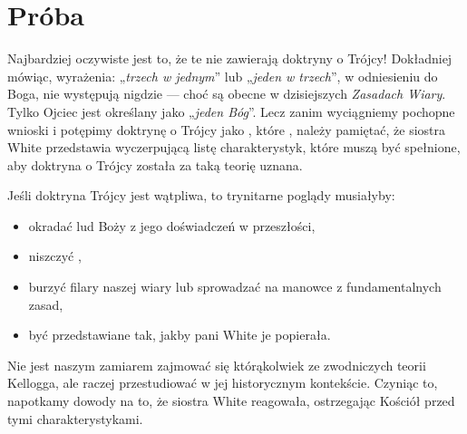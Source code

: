 \section*{Próba}

Najbardziej oczywiste jest to, że te  nie zawierają doktryny o Trójcy! Dokładniej mówiąc, wyrażenia: „\textit{trzech w jednym}” lub „\textit{jeden w trzech}”, w odniesieniu do Boga, nie występują nigdzie — choć są obecne w dzisiejszych \textit{Zasadach Wiary}. Tylko Ojciec jest określany jako „\textit{jeden Bóg}”. Lecz zanim wyciągniemy pochopne wnioski i potępimy doktrynę o Trójcy jako , które , należy pamiętać, że siostra White przedstawia wyczerpującą listę charakterystyk, które muszą być spełnione, aby doktryna o Trójcy została za taką teorię uznana.

Jeśli doktryna Trójcy jest wątpliwa, to trynitarne poglądy musiałyby:
\begin{itemize}
    \item okradać lud Boży z jego doświadczeń w przeszłości,
    \item niszczyć ,
    \item burzyć filary naszej wiary lub sprowadzać na manowce z fundamentalnych zasad,
    \item być przedstawiane tak, jakby pani White je popierała.
\end{itemize}

Nie jest naszym zamiarem zajmować się którąkolwiek ze zwodniczych teorii Kellogga, ale raczej przestudiować  w jej historycznym kontekście. Czyniąc to, napotkamy dowody na to, że siostra White reagowała, ostrzegając Kościół przed tymi charakterystykami.


